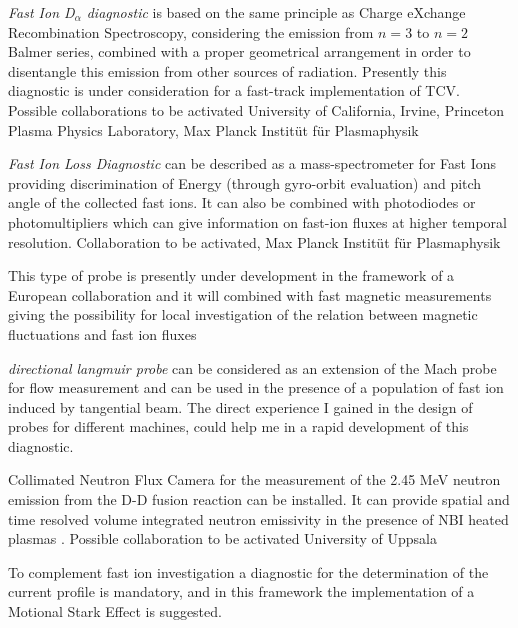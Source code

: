\documentclass[12pt,a4paper]{article}
\begin{document}
\begin{description}[labelindent=0pt, labelsep*=0.4em, leftmargin=!, itemsep=0.02ex]
\item[FIDA:] \emph{Fast Ion D$_{\alpha}$ diagnostic} is based on the
  same principle as Charge eXchange Recombination Spectroscopy,
  considering the emission from $n=3$ to $n=2$ Balmer series, combined
  with a proper geometrical arrangement in order to disentangle this
  emission from other sources of radiation. Presently this diagnostic
  is under consideration for a fast-track implementation of
  TCV. Possible collaborations to be activated University of
  California, Irvine, Princeton Plasma Physics Laboratory, Max Planck Instit{\"u}t f{\"u}r Plasmaphysik
\item[FILD:] \emph{Fast Ion Loss Diagnostic} can be described as a
  mass-spectrometer for Fast Ions providing discrimination of Energy
  (through gyro-orbit evaluation) and pitch angle of the collected
  fast ions. It can also be combined with photodiodes or
  photomultipliers which can give information on fast-ion fluxes at
  higher temporal resolution. Collaboration to be activated, Max
  Planck Instit{\"u}t f{\"u}r Plasmaphysik
\item[Ion Energy Analyzer probe:] This type of probe is presently
  under development in the framework of a European collaboration and
  it will combined with fast magnetic measurements giving the
  possibility for local investigation of the relation between magnetic
  fluctuations and fast ion fluxes
\item[DLP:] \emph{directional langmuir probe} can be considered as an
  extension of the Mach probe for flow measurement and can be used in
  the 
  presence of a population of fast ion induced by tangential
  beam. The direct experience I gained in the design of probes for different
  machines, could help me in a rapid development of this diagnostic. 
\item[Neutron Camera:] Collimated Neutron Flux Camera for the
  measurement of the 2.45 MeV neutron emission from the D-D fusion
  reaction can be installed. It can provide spatial and time
  resolved volume integrated neutron emissivity in the presence of NBI
  heated plasmas \cite{Cecconello:2014hw}. Possible collaboration to be activated
  University of Uppsala
\end{description}
To complement fast ion investigation a diagnostic for the
determination of the current profile is mandatory, and in this
framework the implementation of a Motional Stark Effect is suggested.
\end{document}
